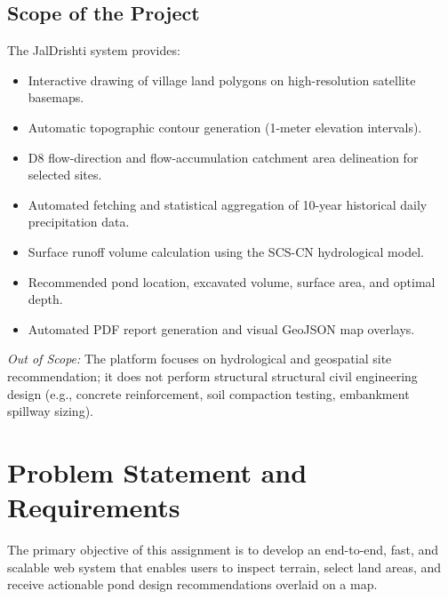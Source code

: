 \documentclass[manuscript,screen,review]{acmart}
\begin{document}
\subsection{Scope of the Project}
The JalDrishti system provides:
\begin{itemize}
    \item Interactive drawing of village land polygons on high-resolution satellite basemaps.
    \item Automatic topographic contour generation (1-meter elevation intervals).
    \item D8 flow-direction and flow-accumulation catchment area delineation for selected sites.
    \item Automated fetching and statistical aggregation of 10-year historical daily precipitation data.
    \item Surface runoff volume calculation using the SCS-CN hydrological model.
    \item Recommended pond location, excavated volume, surface area, and optimal depth.
    \item Automated PDF report generation and visual GeoJSON map overlays.
\end{itemize}
\textit{Out of Scope:} The platform focuses on hydrological and geospatial site recommendation; it does not perform structural structural civil engineering design (e.g., concrete reinforcement, soil compaction testing, embankment spillway sizing).

\section{Problem Statement and Requirements}
\label{sec:requirements}
The primary objective of this assignment is to develop an end-to-end, fast, and scalable web system that enables users to inspect terrain, select land areas, and receive actionable pond design recommendations overlaid on a map.
\end{document}
